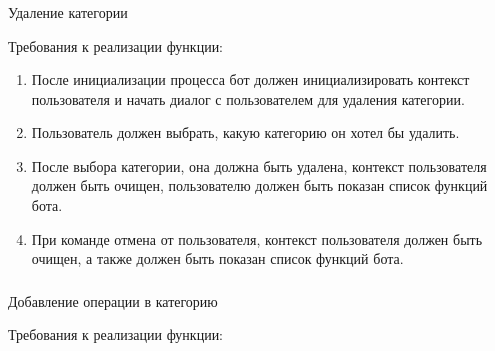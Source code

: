 \subsubsection{} Удаление категории
\label{sec:domain:specification:deletecategory}

Требования к реализации функции:

\begin{enumerate}
	\item После инициализации процесса бот должен инициализировать контекст пользователя и начать диалог с пользователем для удаления категории.
	\item Пользователь должен выбрать, какую категорию он хотел бы удалить.
	\item После выбора категории, она должна быть удалена, контекст пользователя должен быть очищен, пользователю должен быть показан список функций бота.
	\item При команде отмена от пользователя, контекст пользователя должен быть очищен, а также должен быть показан список функций бота.
\end{enumerate}

\subsubsection{} Добавление операции в категорию
\label{sec:domain:specification:addoperationtocategory}

Требования к реализации функции:

